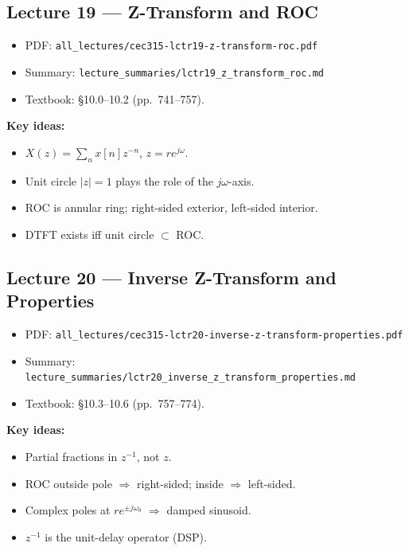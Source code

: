 \documentclass[11pt]{article}
\begin{document}
\subsection{Lecture 19 --- Z-Transform and ROC}
\begin{itemize}[leftmargin=*]
  \item PDF: \texttt{all\_lectures/cec315-lctr19-z-transform-roc.pdf}
  \item Summary: \texttt{lecture\_summaries/lctr19\_z\_transform\_roc.md}
  \item Textbook: \S 10.0--10.2 (pp.~741--757).
\end{itemize}
\textbf{Key ideas:}
\begin{itemize}[leftmargin=*]
  \item $X(z) = \sum_n x[n] z^{-n}$, $z = re^{j\omega}$.
  \item Unit circle $|z|=1$ plays the role of the $j\omega$-axis.
  \item ROC is annular ring; right-sided exterior, left-sided interior.
  \item DTFT exists iff unit circle $\subset$ ROC.
\end{itemize}

\subsection{Lecture 20 --- Inverse Z-Transform and Properties}
\begin{itemize}[leftmargin=*]
  \item PDF: \texttt{all\_lectures/cec315-lctr20-inverse-z-transform-properties.pdf}
  \item Summary: \texttt{lecture\_summaries/lctr20\_inverse\_z\_transform\_properties.md}
  \item Textbook: \S 10.3--10.6 (pp.~757--774).
\end{itemize}
\textbf{Key ideas:}
\begin{itemize}[leftmargin=*]
  \item Partial fractions in $z^{-1}$, not $z$.
  \item ROC outside pole $\Rightarrow$ right-sided; inside $\Rightarrow$ left-sided.
  \item Complex poles at $re^{\pm j\omega_0}$ $\Rightarrow$ damped sinusoid.
  \item $z^{-1}$ is the unit-delay operator (DSP).
\end{itemize}
\end{document}
